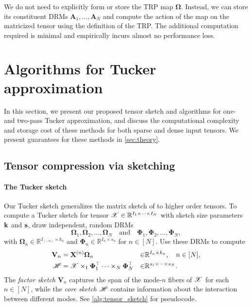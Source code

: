 We do not need to explicitly form or store the TRP map $\mathbf{\Omega}$.
Instead,
we can store its constituent DRMs $\mathbf{A}_1, \dots, \mathbf{A}_N$
and compute the action of the map on the matricized tensor
using the definition of the TRP.
The additional computation required is minimal and empirically incurs almost no performance loss.

\section{Algorithms for Tucker approximation}
In this section, we present our proposed tensor sketch and
algorithms for one- and two-pass Tucker approximation,
and discuss the computational complexity and storage cost of these methods
for both sparse and dense input tensors.
We present guarantees for these methods in \ref{sec:theory}.

\subsection{Tensor compression via sketching}\label{sec:sketch}

\paragraph{The Tucker sketch}
Our Tucker sketch generalizes the matrix sketch of \cite{tropp2018more} to higher order tensors.
To compute a Tucker sketch for tensor $\T{X} \in \reals^{I_1 \times \cdots \times I_N}$
with sketch size parameters $\mathbf{k}$ and $\mathbf{s}$,
draw independent, random DRMs
\begin{equation}\label{sketches}
\mathbf{\Omega}_1, \mathbf{\Omega}_2, \dots, \mathbf{\Omega}_N \quad \text{and} \quad \mathbf{\Phi}_1, \mathbf{\Phi}_2, \dots, \mathbf{\Phi}_N,
\end{equation}
with $\mathbf{\Omega}_n \in \mathbb{R}^{I_{(-n)} \times k_n}$ and
$\mathbf{\Phi}_n \in \mathbb{R}^{I_n \times s_n}$ for $n \in [N]$.
Use these DRMs to compute%
\begin{align*}
\label{eq:sketchy_matrix}
\M{V}_n  &= \M{X}^{(n)}\M{\Omega}_n &\in &\reals^{I_n \times k_n}, \quad n \in [N], \\
\T{H}    &= \T{X} \times_1 \M{\Phi}_1^\top \cdots \times_N \M{\Phi}_N^\top &\in &\reals^{s_1 \times \cdots \times s_N}.
\end{align*}
The \emph{factor sketch} $\mathbf{V}_n$
captures the span of the mode-$n$ fibers of $\T{X}$ for each $n \in [N]$,
while the \emph{core sketch} $\T{H}$ contains information about
the interaction between different modes.
See \ref{alg:tensor_sketch} for pseudocode.

